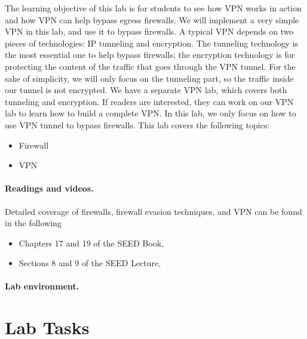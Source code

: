 The learning objective of this lab is for students to see 
how VPN works in action and how VPN can help bypass egress firewalls.     
We will implement a very simple VPN in this lab, and use it to bypass
firewalls. A typical VPN depends on two pieces of technologies: IP tunneling
and encryption. The tunneling technology is the most essential one to help
bypass firewalls; the encryption technology is for protecting the content
of the traffic that goes through the VPN tunnel. 
For the sake of simplicity, we will only focus on the tunneling part,
so the traffic inside our tunnel is not encrypted. We have a separate
VPN lab, which covers both tunneling and encryption. If readers are
interested, they can work on our VPN lab to learn how to build a complete
VPN. In this lab, we only focus on how to use VPN tunnel to bypass firewalls.
This lab covers the following topics:

\begin{itemize}[noitemsep]
\item Firewall
\item VPN
\end{itemize}


\paragraph{Readings and videos.}
Detailed coverage of firewalls, firewall evasion techniques, and VPN can be found in
the following

\begin{itemize}
\item Chapters 17 and 19 of the SEED Book, \seedbook
\item Sections 8 and 9 of the SEED Lecture, \seedisvideo
\end{itemize}


\paragraph{Lab environment.} \seedenvironment
 


\section{Lab Tasks}




